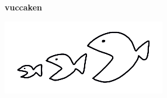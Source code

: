 \documentclass[uplatex,dvipdfmx]{vkaishi}
\begin{document}
\clearpage\thispagestyle{empty}\mbox{}\newpage %
\ifodd\thepage %
  \thispagestyle{empty}\mbox{}\newpage
\fi

\thispagestyle{empty}
\quad

\vspace{70truemm}

\begin{center}
  \ttfamily\bfseries \fontsize{15}{0}\selectfont
  vuccaken
  \\ \vspace{1zw}
  \vYear
\end{center}

\vspace{5truemm}

\begin{center}
  \includegraphics[width=.5\textwidth]{img/sakana.png}
\end{center}
\end{document}
